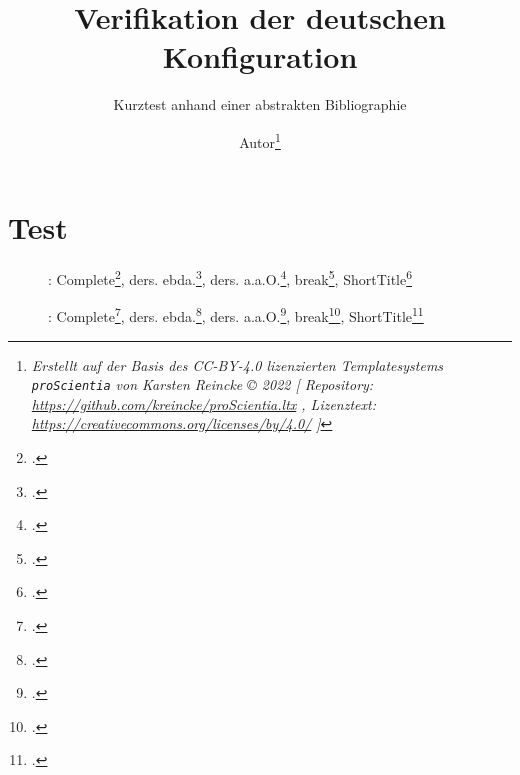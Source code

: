 \documentclass[
  DIV=calc,i
  BCOR=5mm,
  11pt,
  headings=small,
  oneside,
  abstract=true,
  toc=bib,
  english,ngerman]{scrartcl}
\begin{document}
\nocite{*}

\titlehead{Bib\LaTeX}
\subject{Release 1.0}
\title{Verifikation der deutschen Konfiguration}
\subtitle{Kurztest anhand einer abstrakten Bibliographie}
\author{Autor\footnote{
\textit{Erstellt auf der Basis des CC-BY-4.0 lizenzierten Templatesystems \texttt{proScientia} von Karsten Reincke \copyright{} 2022 [
Repository: \href{https://github.com/kreincke/proScientia.ltx}{https://github.com/kreincke/proScientia.ltx} ,
Lizenztext: \href{https://creativecommons.org/licenses/by/4.0/}{https://creativecommons.org/licenses/by/4.0/} ]}}
}


\maketitle

\footnotesize
\tableofcontents

\normalsize

\section{Test}
\begin{description}
  \item[\mars]: Complete\footcite[vgl.][15]{ICOLLa}, ders. ebda.\footcite[vgl.][15]{ICOLLa}, ders. a.a.O.\footcite[vgl.][23]{ICOLLa}, break\footcite[vgl.][15]{BR2020a}, ShortTitle\footcite[vgl.][15]{ICOLLa}

  \item[\mars]: Complete\footcite[vgl.][15]{IPROCa}, ders. ebda.\footcite[vgl.][15]{IPROCa}, ders. a.a.O.\footcite[vgl.][23]{IPROCa}, break\footcite[vgl.][15]{BR2020a}, ShortTitle\footcite[vgl.][15]{IPROCa}
\end{description}



\printnomenclature
\printbibliography
\end{document}
